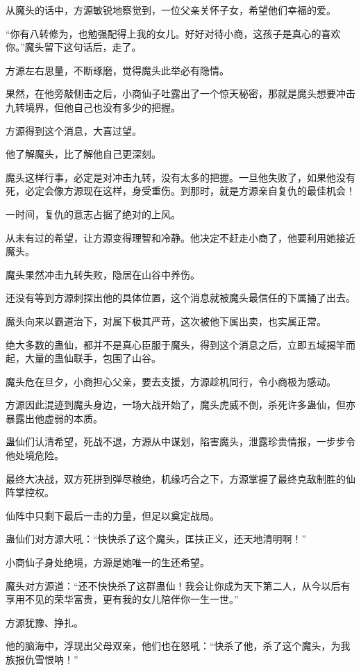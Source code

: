 \begin{this_body}
从魔头的话中，方源敏锐地察觉到，一位父亲关怀子女，希望他们幸福的爱。

“你有八转修为，也勉强配得上我的女儿。好好对待小商，这孩子是真心的喜欢你。”魔头留下这句话后，走了。

方源左右思量，不断琢磨，觉得魔头此举必有隐情。

果然，在他旁敲侧击之后，小商仙子吐露出了一个惊天秘密，那就是魔头想要冲击九转境界，但他自己也没有多少的把握。

方源得到这个消息，大喜过望。

他了解魔头，比了解他自己更深刻。

魔头这样行事，必定是对冲击九转，没有太多的把握。一旦他失败了，如果他没有死，必定会像方源现在这样，身受重伤。到那时，就是方源亲自复仇的最佳机会！

一时间，复仇的意志占据了绝对的上风。

从未有过的希望，让方源变得理智和冷静。他决定不赶走小商了，他要利用她接近魔头。

魔头果然冲击九转失败，隐居在山谷中养伤。

还没有等到方源刺探出他的具体位置，这个消息就被魔头最信任的下属捅了出去。

魔头向来以霸道治下，对属下极其严苛，这次被他下属出卖，也实属正常。

绝大多数的蛊仙，都并不是真心臣服于魔头，得到这个消息之后，立即五域揭竿而起，大量的蛊仙联手，包围了山谷。

魔头危在旦夕，小商担心父亲，要去支援，方源趁机同行，令小商极为感动。

方源因此混迹到魔头身边，一场大战开始了，魔头虎威不倒，杀死许多蛊仙，但亦暴露出他虚弱的本质。

蛊仙们认清希望，死战不退，方源从中谋划，陷害魔头，泄露珍贵情报，一步步令他处境危险。

最终大决战，双方死拼到弹尽粮绝，机缘巧合之下，方源掌握了最终克敌制胜的仙阵掌控权。

仙阵中只剩下最后一击的力量，但足以奠定战局。

蛊仙们对方源大吼：“快快杀了这个魔头，匡扶正义，还天地清明啊！”

小商仙子身处绝境，方源是她唯一的生还希望。

魔头对方源道：“还不快快杀了这群蛊仙！我会让你成为天下第二人，从今以后有享用不见的荣华富贵，更有我的女儿陪伴你一生一世。”

方源犹豫、挣扎。

他的脑海中，浮现出父母双亲，他们也在怒吼：“快杀了他，杀了这个魔头，为我族报仇雪恨呐！”


\end{this_body}
